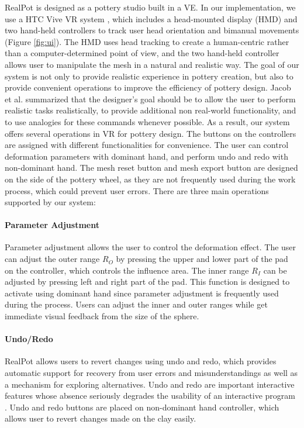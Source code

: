 \documentclass{svjour3}                     %
\begin{document}
RealPot is designed as a pottery studio built in a VE.
In our implementation, we use a HTC Vive VR system \cite{website:vive}, which includes a head-mounted display (HMD) and two hand-held controllers to track user head orientation and bimanual movements (Figure \ref{fig:ui}).
The HMD uses head tracking to create a human-centric rather than a computer-determined point of view, and the two hand-held controller allows user to manipulate the mesh in a natural and realistic way.
The goal of our system is not only to provide realistic experience in pottery creation, but also to provide convenient operations to improve the efficiency of pottery design. 
Jacob et al. \cite{Jacob2008Reality} summarized that the designer's goal should be to allow the user to perform realistic tasks realistically, to provide additional non real-world functionality, and to use analogies for these commands whenever possible.
As a result, our system offers several operations in VR for pottery design.
The buttons on the controllers are assigned with different functionalities for convenience. The user can control deformation parameters with dominant hand, and perform undo and redo with non-dominant hand.
The mesh reset button and mesh export button are designed on the side of the pottery wheel, as they are not frequently used during the work process, which could prevent user errors.
There are three main operations supported by our system:

\paragraph{Parameter Adjustment}
Parameter adjustment allows the user to control the deformation effect.
The user can adjust the outer range $R_{O}$ by pressing the upper and lower part of the pad on the controller, which controls the influence area. The inner range $R_{I}$ can be adjusted by pressing left and right part of the pad. This function is designed to activate using dominant hand since parameter adjustment is frequently used during the process. Users can adjust the inner and outer ranges while get immediate visual feedback from the size of the sphere.

\paragraph{Undo/Redo}
RealPot allows users to revert changes using undo and redo, which provides automatic support for recovery from user errors and misunderstandings as well as a mechanism for exploring alternatives.
Undo and redo are important interactive features whose absence seriously degrades the usability of an interactive program \cite{choudhary1995general}.
Undo and redo buttons are placed on non-dominant hand controller, which allows user to revert changes made on the clay easily.
\end{document}
